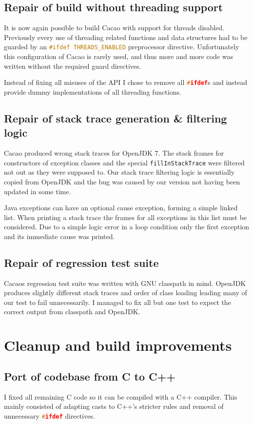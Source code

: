 \documentclass[12pt,a4paper,oneside]{article}
\newcommand{\cpp}[1]{\lstinline[language=C++]{#1}}
\newcommand{\java}[1]{\lstinline[language=Java]{#1}}
\begin{document}
\subsection{Repair of build without threading support}
	It is now again possible to build Cacao with support for threads disabled.
	Previously every use of threading related functions and data structures had to be guarded by an \cpp{#ifdef THREADS_ENABLED} 
	preprocessor directive.
	Unfortunately this configuration of Cacao is rarely used, and thus more and more code was written without the required guard directives.

	Instead of fixing all misuses of the API I chose to remove all \cpp{#ifdef}s and instead provide dummy implementations of all
	threading functions.

\subsection{Repair of stack trace generation \& filtering logic}
	Cacao produced wrong stack traces for OpenJDK 7. 
	The stack frames for constructors of exception classes and the special \java{fillInStackTrace} were filtered not out as they were supposed to.
	Our stack trace filtering logic is essentially copied from OpenJDK and the bug was caused by our version not having been updated in some time.

	Java exceptions can have an optional cause exception, forming a simple linked list.
	When printing a stack trace the frames for all exceptions in this list must be considered.
	Due to a simple logic error in a loop condition only the first exception and its immediate cause was printed.

\subsection{Repair of regression test suite}
	Cacaos regression test suite was written with GNU classpath in mind.
	OpenJDK produces slightly different stack traces and order of class loading leading many of our test to fail unnecessarily.
	I managed to fix all but one test to expect the correct output from classpath and OpenJDK.

\section{Cleanup and build improvements}
\label{cleanup}

\subsection{Port of codebase from C to C++}
	I fixed all remaining C code so it can be compiled with a C++ compiler.
	This mainly consisted of adapting casts to C++'s stricter rules and removal of unnecessary \cpp{#ifdef} directives.
\end{document}
